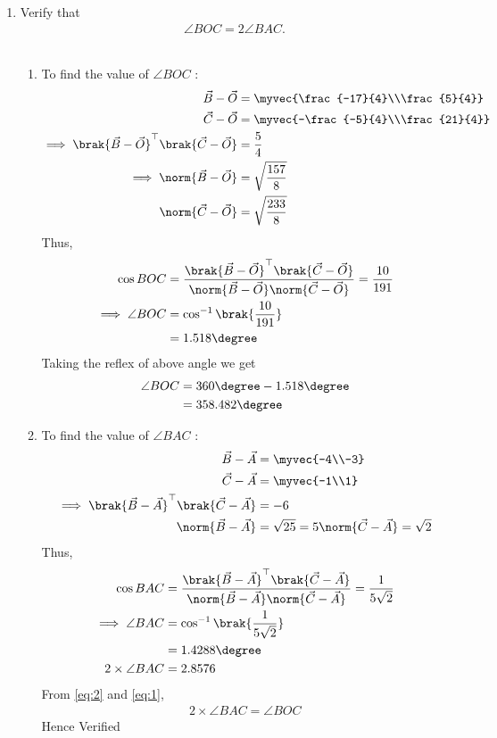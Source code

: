 \documentclass[11pt]{book}
\begin{document}
\begin{enumerate}[label=\thesection.\arabic*.,ref=\thesection.\theenumi]
\item Verify that 
\begin{align}
\angle BOC = 2\angle BAC.
\end{align}\\
 \solution
\begin{enumerate}
\item To find  the value of $\angle{BOC}$ :
\begin{align}
\vec{B}-\vec{O}
          &=\myvec{\frac{-17}{4}\\\frac{5}{4}} \\
\vec{C}-\vec{O}
         & =\myvec{-\frac{-5}{4}\\\frac{21}{4}}
	  \\
\implies \brak{\vec{B}-\vec{O}}^{\top}\brak{\vec{C}-\vec{O}}&=\frac{5}{4}\\
	\implies \norm{\vec{B}-\vec{O}}&=  \sqrt{\frac{157}{8}} \\
	\norm{\vec{C}-\vec{O}} &=  \sqrt{\frac{233}{8}}
\end{align}
Thus,
\begin{align}
\cos{BOC}&=\frac{\brak{\vec{B}-\vec{O}}^{\top}\brak{\vec{C}-\vec{O}}}{\norm{\vec{B}-\vec{O}}\norm{\vec{C}-\vec{O}}}
=\frac{10}{191}\\
\implies\angle{BOC}&=\cos^{-1}\brak{\frac{10}{191}}
\\
	&=1.518\degree
\end{align}
Taking the reflex of above angle we get 
\begin{align}
    \angle{BOC}&=360\degree-1.518\degree \\
    &= 358.482\degree
\end{align}
	\item To find  the value of $\angle{BAC}$ :
\begin{align}
\vec{B}-\vec{A}&=\myvec{-4\\-3} \\
\vec{C}-\vec{A}&=\myvec{-1\\1}
\\
\implies \brak{\vec{B}-\vec{A}}^{\top}\brak{\vec{C}-\vec{A}}&=-6
\\
	\norm{\vec{B}-\vec{A}}&= \sqrt{25}= 5
	\norm{\vec{C}-\vec{A}}= \sqrt{2}
\end{align}
Thus,
\begin{align}
\cos{BAC}&=\frac{\brak{\vec{B}-\vec{A}}^{\top}\brak{\vec{C}-\vec{A}}}{\norm{\vec{B}-\vec{A}}\norm{\vec{C}-\vec{A}}}
=\frac{1}{5\sqrt{2}}\\
\implies\angle{BAC}&=\cos^{-1}\brak{\frac{1}{5\sqrt{2}}}\\
&=1.4288\degree \label{eq:2}  \\
2\times\angle{BAC} &= 2.8576
\end{align}
From \eqref{eq:2} and \eqref{eq:1},
\begin{align}
2\times\angle{BAC}
= \angle{BOC}
\end{align}
Hence Verified
\end{enumerate}


\end{enumerate}
\end{document}

